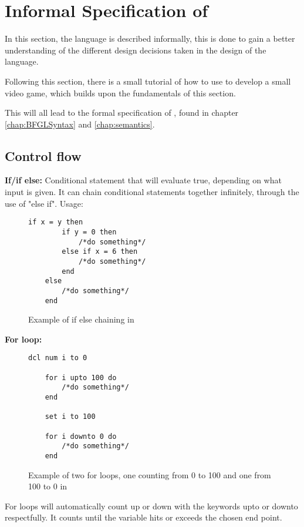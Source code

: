 \section{Informal Specification of \lang{}}
\label{sec:InformalSpecification}
In this section, the \lang{} language is described informally, this is done to gain a better understanding of the different design decisions taken in the design of the language. 

Following this section, there is a small tutorial of how to use \lang{} to develop a small video game, which builds upon the fundamentals of this section.

This will all lead to the formal specification of \lang{}, found in chapter \ref{chap:BFGLSyntax} and \ref{chap:semantics}.

\subsection{Control flow}
\textbf{If/if else:}
Conditional statement that will evaluate true, depending on what input is given. It can chain conditional statements together infinitely, through the use of "else if".
Usage:
\begin{figure}[H]
    \centering
    \begin{lstlisting}[style=gglang]
    if x = y then
        if y = 0 then
            /*do something*/
        else if x = 6 then
            /*do something*/
        end
    else
        /*do something*/
    end
\end{lstlisting}
    \caption{Example of if else chaining in \lang{}}\label{fig:ifelse}
\end{figure}

\textbf{For loop:} 

\begin{figure}[H]
    \centering
    \begin{lstlisting}[style=gglang]
    dcl num i to 0
    
    for i upto 100 do
	    /*do something*/
    end

    set i to 100

    for i downto 0 do
	    /*do something*/
    end
\end{lstlisting}
    \caption{Example of two for loops, one counting from 0 to 100 and one from 100 to 0 in \lang{}}\label{fig:forloop}
\end{figure}
For loops will automatically count up or down with the keywords upto or downto respectfully. It counts until the variable hits or exceeds the chosen end point.

